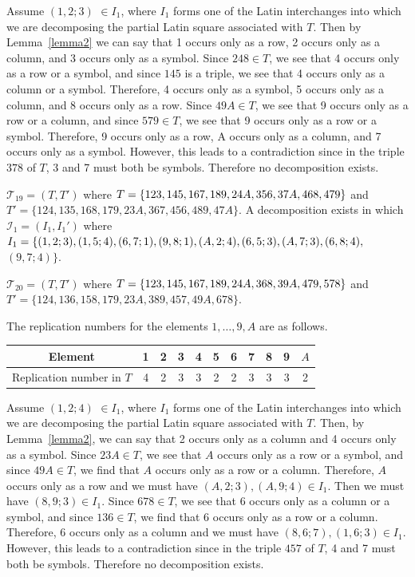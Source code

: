 \documentclass[12pt]{report}
\begin{document}
Assume $(1, 2; 3)$ $\in I_1$, where $I_1$ forms one of the Latin interchanges
into which we are decomposing the partial Latin square associated 
with $T$.  Then by Lemma~\ref{lemma2} we can say that 
1 occurs only as a row, 2 occurs only as a column, and 3 occurs 
only as a symbol.  Since $248 \in T$, 
we see that 4 occurs only as a row or a symbol, and since $145$
is a triple, we see that 4 occurs only as a column or a symbol.
Therefore, 4 occurs only as a symbol, 5 occurs only as a column,
and 8 occurs only as a row.
Since $49A \in T$, we see that 9 occurs only as a row
or a column, and since $579 \in T$, we see that 9
occurs only as a row or a symbol.  Therefore, 9 occurs only as
a row, A occurs only as a column, and 7 occurs only as a symbol.
However, this leads to a contradiction since in the triple $378$ of $T$,
3 and 7 must both be symbols.  Therefore no decomposition exists.

 ${\mathcal T}_{19}=(T,T')$ 
where $T=\{1 2 3,1 4 5,1 6 7,1 8 9,2 4 A,3 5 6,3 7 A,
4 6 8,\break 4 7 9\}$ and
$T'=\{1 2 4,1 3 5,1 6 8,1 7 9,2 3 A,3 6 7,4 5 6,4 8 9,4 7 A \}$.
A decomposition exists in which 
${\mathcal I}_1 = (I_1,I_1')$ where 
$I_1=\{(1, 2; 3),
(1, 5; 4),
(6, 7; 1),(9, 8; 1),(A, 2; 4),(6, 5; 3),\break
(A, 7; 3),(6, 8; 4),$ 
$(9,7;4)\}$.

 ${\mathcal T}_{20}=(T,T')$ 
where $T=\{1 2 3,1 4 5,1 6 7,1 8 9,2 4 A,3 6 8,3 9 A,\break
4 7 9,5 7 8\}$ 
and $T'=\{1 2 4,1 3 6,1 5 8,1 7 9,2 3 A,3 8 9,4 5 7,4 9 A,6 7 8\}$.

The replication numbers for the elements $1,\dots, 9, A$ are as
follows.

\begin{center}
\begin{tabular}{c|c|c|c|c|c|c|c|c|c|c}
Element              & 1 & 2 & 3 & 4 & 5 & 6 & 7 & 8 & 9 & $A$ \\
			  \hline
 Replication  number in $T$ & 4 & 2 & 3 & 3 & 2 & 2 & 3 & 3 & 3 & 2
\end{tabular}
\end{center}

Assume $(1, 2; 4)$ $\in I_1$, where $I_1$ forms one of the Latin interchanges 
into which we are decomposing the partial Latin square associated 
with $T$.  Then, by Lemma~\ref{lemma2}, we can say that 
2 occurs only as a column and 4 occurs 
only as a symbol.  Since $23A \in T$, we see that 
$A$ occurs only as a row or a symbol, and since $49A \in T$, 
we find that $A$ occurs only as a row or a column. Therefore, $A$ occurs 
only as a row and we must have $(A,2;3),(A,9;4)\in I_1$.
Then we must have $(8,9;3)\in I_1$.
Since $678 \in T$, we see that $6$ occurs only 
as a column or a symbol, and since $136 \in T$, 
we find that $6$ occurs only as a row or a column. Therefore, $6$ occurs 
only as a column and we must have $(8,6;7),(1,6;3)\in I_1$.
However, this leads to a contradiction since in the triple $457$ of $T$,
4 and 7 must both be symbols.  Therefore no decomposition exists.
\end{document}
